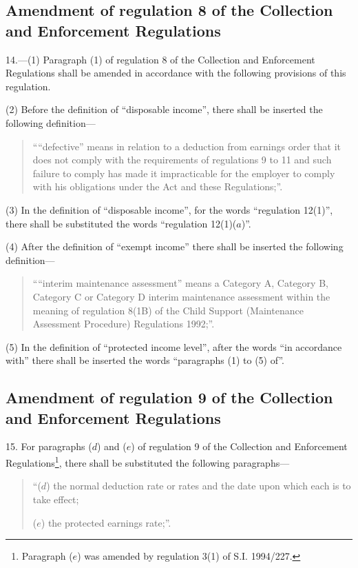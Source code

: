 \documentclass[12pt,a4paper]{article}
\begin{document}
\subsection[14. Amendment of regulation 8 of the Collection and Enforcement Regulations]{Amendment of regulation 8 of the Collection and Enforcement Regulations}

14.—(1) Paragraph (1) of regulation 8 of the Collection and Enforcement Regulations shall be amended in accordance with the following provisions of this regulation.

(2) Before the definition of “disposable income”, there shall be inserted the following definition—
\begin{quotation}
““defective” means in relation to a deduction from earnings order that it does not comply with the requirements of regulations 9 to 11 and such failure to comply has made it impracticable for the employer to comply with his obligations under the Act and these Regulations;”.
\end{quotation}

(3) In the definition of “disposable income”, for the words “regulation 12(1)”, there shall be substituted the words “regulation 12(1)($a$)”.

(4) After the definition of “exempt income” there shall be inserted the following definition—
\begin{quotation}
““interim maintenance assessment” means a Category A, Category B, Category C or Category D interim maintenance assessment within the meaning of regulation 8(1B) of the Child Support (Maintenance Assessment Procedure) Regulations 1992;”.
\end{quotation}

(5) In the definition of “protected income level”, after the words “in accordance with” there shall be inserted the words “paragraphs (1) to (5) of”.

\subsection[15. Amendment of regulation 9 of the Collection and Enforcement Regulations]{Amendment of regulation 9 of the Collection and Enforcement Regulations}

15.  For paragraphs ($d$) and ($e$) of regulation 9 of the Collection and Enforcement Regulations\footnote{\frenchspacing Paragraph ($e$) was amended by regulation 3(1) of S.I. 1994/227.}, there shall be substituted the following paragraphs—
\begin{quotation}
“($d$) the normal deduction rate or rates and the date upon which each is to take effect;

($e$) the protected earnings rate;”.
\end{quotation}
\end{document}
